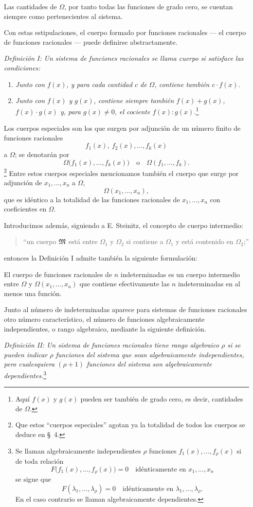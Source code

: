 \documentclass[11pt]{article}
\begin{document}
Las cantidades de $\Omega$, por tanto todas las funciones de grado cero, se cuentan siempre como pertenecientes al sistema.

Con estas estipulaciones, el cuerpo formado por funciones racionales --- el cuerpo de funciones racionales --- puede definirse abstractamente.

\emph{Definición I: Un sistema de funciones racionales se llama cuerpo si satisface las condiciones:}
\begin{enumerate}
\item \emph{Junto con $f(x)$, y para cada cantidad $c$ de $\Omega$, contiene también $c\cdot f(x)$.}
\item \emph{Junto con $f(x)$ y $g(x)$, contiene siempre también $f(x)+g(x)$, $f(x)\cdot g(x)$ y, para $g(x)\ne0$, el cociente $f(x):g(x)$.}\footnote{Aquí $f(x)$ y $g(x)$ pueden ser también de grado cero, es decir, cantidades de $\Omega$.}
\end{enumerate}
Los cuerpos especiales son los que surgen por adjunción de un número finito de funciones racionales
\[
  f_1(x),\ f_2(x),\ldots, f_k(x)
\]
a $\Omega$; se denotarán por
\[
  \Omega\bigl(f_1(x),\ldots,f_k(x)\bigr)
  \quad\text{o}\quad
  \Omega(f_1,\ldots,f_k).
\]
\footnote{Que estos ``cuerpos especiales'' agotan ya la totalidad de todos los cuerpos se deduce en \S\ 4.}
Entre estos cuerpos especiales mencionamos también el cuerpo que surge por adjunción de $x_1,\ldots,x_n$ a $\Omega$,
\[
  \Omega(x_1,\ldots,x_n),
\]
que es idéntico a la totalidad de las funciones racionales de $x_1,\ldots,x_n$ con coeficientes en $\Omega$.

Introducimos además, siguiendo a E. Steinitz, el concepto de cuerpo intermedio:
\begin{quote}
``un cuerpo $\mathfrak{M}$ está entre $\Omega_1$ y $\Omega_2$ si contiene a $\Omega_1$ y está contenido en $\Omega_2$;''
\end{quote}
entonces la Definición I admite también la siguiente formulación:

El cuerpo de funciones racionales de $n$ indeterminadas es un cuerpo intermedio entre $\Omega$ y $\Omega(x_1,\ldots,x_n)$ que contiene efectivamente las $n$ indeterminadas en al menos una función.

Junto al número de indeterminadas aparece para sistemas de funciones racionales otro número característico, el número de funciones algebraicamente independientes, o rango algebraico, mediante la siguiente definición.

\emph{Definición II: Un sistema de funciones racionales tiene rango algebraico $\rho$ si se pueden indicar $\rho$ funciones del sistema que sean algebraicamente independientes, pero cualesquiera $(\rho+1)$ funciones del sistema son algebraicamente dependientes.}\footnote{Se llaman algebraicamente independientes $\rho$ funciones $f_1(x),\ldots,f_\rho(x)$ si de toda relación
\[
F\bigl(f_1(x),\ldots,f_\rho(x)\bigr)=0\quad\text{idénticamente en }x_1,\ldots,x_n
\]
se sigue que
\[
F(\lambda_1,\ldots,\lambda_\rho)=0\quad\text{idénticamente en }\lambda_1,\ldots,\lambda_\rho.
\]
En el caso contrario se llaman algebraicamente dependientes.}
\end{document}
